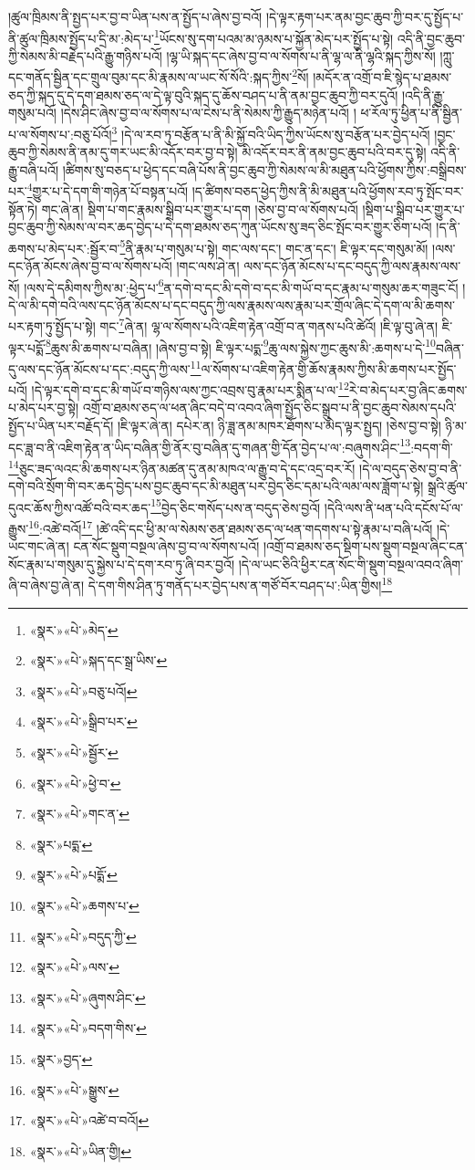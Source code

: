 །ཚུལ་ཁྲིམས་ནི་སྤྱད་པར་བྱ་བ་ཡིན་པས་ན་སྤྱོད་པ་ཞེས་བྱ་བའོ། །དེ་ལྟར་རྟག་པར་ནམ་བྱང་ཆུབ་ཀྱི་བར་དུ་སྤྱོད་པ་ནི་ཚུལ་ཁྲིམས་སྤྱོད་པ་དྲི་མ་:མེད་པ་\footnote{«སྣར་»«པེ་»མེད་}ཡོངས་སུ་དག་པའམ་མ་ཉམས་པ་སྐྱོན་མེད་པར་སྤྱོད་པ་སྟེ། འདི་ནི་བྱང་ཆུབ་ཀྱི་སེམས་མི་བརྗེད་པའི་རྒྱུ་གཉིས་པའོ། །ལྷ་ཡི་སྐད་དང་ཞེས་བྱ་བ་ལ་སོགས་པ་ནི་ལྷ་ལ་ནི་ལྷའི་སྐད་ཀྱིས་སོ། །ཀླུ་དང་གནོད་སྦྱིན་དང་གྲུལ་བུམ་དང་མི་རྣམས་ལ་ཡང་སོ་སོའི་:སྐད་ཀྱིས་\footnote{«སྣར་»«པེ་»སྐད་དང་སྒྲ་ཡིས་}སོ། །མདོར་ན་འགྲོ་བ་ཇི་སྙེད་པ་ཐམས་ཅད་ཀྱི་སྐད་དུ་དེ་དག་ཐམས་ཅད་ལ་དེ་ལྟ་བུའི་སྐད་དུ་ཆོས་བཤད་པ་ནི་ནམ་བྱང་ཆུབ་ཀྱི་བར་དུའོ། །འདི་ནི་རྒྱུ་གསུམ་པའོ། །དེས་ཤིང་ཞེས་བྱ་བ་ལ་སོགས་པ་ལ་ངེས་པ་ནི་སེམས་ཀྱི་རྒྱུད་མཉེན་པའོ། །
ཕ་རོལ་ཏུ་ཕྱིན་པ་ནི་སྦྱིན་པ་ལ་སོགས་པ་:བཅུ་པོའོ།\footnote{«སྣར་»«པེ་»བཅུ་པའོ།} །དེ་ལ་རབ་ཏུ་བརྩོན་པ་ནི་མི་སྐྱོ་བའི་ཡིད་ཀྱིས་ཡོངས་སུ་བརྩོན་པར་བྱེད་པའོ། །བྱང་ཆུབ་ཀྱི་སེམས་ནི་ནམ་དུ་གར་ཡང་མི་འདོར་བར་བྱ་བ་སྟེ། མི་འདོར་བར་ནི་ནམ་བྱང་ཆུབ་པའི་བར་དུ་སྟེ། འདི་ནི་རྒྱུ་བཞི་པའོ། །ཚིགས་སུ་བཅད་པ་ཕྱེད་དང་བཞི་པོས་ནི་བྱང་ཆུབ་ཀྱི་སེམས་ལ་མི་མཐུན་པའི་ཕྱོགས་ཀྱིས་:བསྒྲིབས་པར་\footnote{«སྣར་»«པེ་»སྒྲིབ་པར་}གྱུར་པ་དེ་དག་གི་གཉེན་པོ་བསྟན་པའོ། །ད་ཚིགས་བཅད་ཕྱེད་ཀྱིས་ནི་མི་མཐུན་པའི་ཕྱོགས་རབ་ཏུ་སྤོང་བར་སྟོན་ཏེ། གང་ཞེ་ན། སྡིག་པ་གང་རྣམས་སྒྲིབ་པར་གྱུར་པ་དག །ཅེས་བྱ་བ་ལ་སོགས་པའོ། །སྡིག་པ་སྒྲིབ་པར་གྱུར་པ་བྱང་ཆུབ་ཀྱི་སེམས་ལ་བར་ཆད་བྱེད་པ་དེ་དག་ཐམས་ཅད་ཀུན་ཡོངས་སུ་ཟད་ཅིང་སྤོང་བར་གྱུར་ཅིག་པའོ། །ད་ནི་ཆགས་པ་མེད་པར་:སྦྱོར་བ་\footnote{«སྣར་»«པེ་»སྦྱོར་}ནི་རྣམ་པ་གསུམ་པ་སྟེ། གང་ལས་དང་། གང་ན་དང་། ཇི་ལྟར་དང་གསུམ་མོ། །ལས་དང་ཉོན་མོངས་ཞེས་བྱ་བ་ལ་སོགས་པའོ། །གང་ལས་ཤེ་ན། ལས་དང་ཉོན་མོངས་པ་དང་བདུད་ཀྱི་ལས་རྣམས་ལས་སོ། །ལས་དེ་དམིགས་ཀྱིས་མ་:ཕྱེད་པ་\footnote{«སྣར་»«པེ་»ཕྱེ་བ་}ན་དགེ་བ་དང་མི་དགེ་བ་དང་མི་གཡོ་བ་དང་རྣམ་པ་གསུམ་ཆར་གཟུང་ངོ། །དེ་ལ་མི་དགེ་བའི་ལས་དང་ཉོན་མོངས་པ་དང་བདུད་ཀྱི་ལས་རྣམས་ལས་རྣམ་པར་གྲོལ་ཞིང་དེ་དག་ལ་མི་ཆགས་པར་རྟག་ཏུ་སྤྱོད་པ་སྟེ། གང་\footnote{«སྣར་»«པེ་»གང་ན་}ཞེ་ན། ལྷ་ལ་སོགས་པའི་འཇིག་རྟེན་འགྲོ་བ་ན་གནས་པའི་ཚེའོ། །ཇི་ལྟ་བུ་ཞེ་ན། ཇི་ལྟར་པདྨོ་\footnote{«སྣར་»པདྨ་}ཆུས་མི་ཆགས་པ་བཞིན། །ཞེས་བྱ་བ་སྟེ། ཇི་ལྟར་པདྨ་\footnote{«སྣར་»«པེ་»པདྨོ་}ཆུ་ལས་སྐྱེས་ཀྱང་ཆུས་མི་:ཆགས་པ་དེ་\footnote{«སྣར་»«པེ་»ཆགས་པ་}བཞིན་དུ་ལས་དང་ཉོན་མོངས་པ་དང་:བདུད་ཀྱི་ལས་\footnote{«སྣར་»«པེ་»བདུད་ཀྱི་}ལ་སོགས་པ་འཇིག་རྟེན་གྱི་ཆོས་རྣམས་ཀྱིས་མི་ཆགས་པར་སྤྱོད་པའོ། །དེ་ལྟར་དགེ་བ་དང་མི་གཡོ་བ་གཉིས་ལས་ཀྱང་འབྲས་བུ་རྣམ་པར་སྨིན་པ་ལ་\footnote{«སྣར་»«པེ་»ལས་}རེ་བ་མེད་པར་བྱ་ཞིང་ཆགས་པ་མེད་པར་བྱ་སྟེ། འགྲོ་བ་ཐམས་ཅད་ལ་ཕན་ཞིང་བདེ་བ་འབའ་ཞིག་སྤྱོད་ཅིང་སྒྲུབ་པ་ནི་བྱང་ཆུབ་སེམས་དཔའི་སྤྱོད་པ་ཡིན་པར་བརྗོད་དོ། །ཇི་ལྟར་ཞེ་ན། དཔེར་ན། ཉི་ཟླ་ནམ་མཁར་ཐོགས་པ་མེད་ལྟར་སྤྱད། །ཅེས་བྱ་བ་སྟེ། ཉི་མ་དང་ཟླ་བ་ནི་འཇིག་རྟེན་ན་ཡིད་བཞིན་གྱི་ནོར་བུ་བཞིན་དུ་གཞན་གྱི་དོན་བྱེད་པ་ལ་:བཞུགས་ཤིང་\footnote{«སྣར་»«པེ་»ཞུགས་ཤིང་}:བདག་གི་\footnote{«སྣར་»«པེ་»བདག་གིས་}ཅུང་ཟད་ལའང་མི་ཆགས་པར་ཉིན་མཚན་དུ་ནམ་མཁའ་ལ་རྒྱུ་བ་དེ་དང་འདྲ་བར་རོ། །དེ་ལ་བདུད་ཅེས་བྱ་བ་ནི་དགེ་བའི་སྲོག་གི་བར་ཆད་བྱེད་པས་བྱང་ཆུབ་དང་མི་མཐུན་པར་བྱེད་ཅིང་དམ་པའི་ལམ་ལས་ཟློག་པ་སྟེ། སྒྲའི་ཚུལ་དུའང་ཆོས་ཀྱིས་འཚོ་བའི་བར་ཆད་\footnote{«སྣར་»བྱད་}བྱེད་ཅིང་གསོད་པས་ན་བདུད་ཅེས་བྱའོ། །དེའི་ལས་ནི་ཕན་པའི་དངོས་པོ་ལ་རྒྱུས་\footnote{«སྣར་»«པེ་»སྒྱུས་}:འཚེ་བའོ།\footnote{«སྣར་»«པེ་»འཚེ་བ་བའོ།} །ཚེ་འདི་དང་ཕྱི་མ་ལ་སེམས་ཅན་ཐམས་ཅད་ལ་ཕན་གདགས་པ་སྟེ་རྣམ་པ་བཞི་པའོ། །དེ་ཡང་གང་ཞེ་ན། ངན་སོང་སྡུག་བསྔལ་ཞེས་བྱ་བ་ལ་སོགས་པའོ། །འགྲོ་བ་ཐམས་ཅད་སྡིག་པས་སྡུག་བསྔལ་ཞིང་ངན་སོང་རྣམ་པ་གསུམ་དུ་སྐྱེས་པ་དེ་དག་རབ་ཏུ་ཞི་བར་བྱའོ། །དེ་ལ་ཡང་ཅིའི་ཕྱིར་ངན་སོང་གི་སྡུག་བསྔལ་འབའ་ཞིག་ཞི་བ་ཞེས་བྱ་ཞེ་ན། དེ་དག་གིས་ཤིན་ཏུ་གནོད་པར་བྱེད་པས་ན་གཙོ་བོར་བཤད་པ་:ཡིན་གྱིས།\footnote{«སྣར་»«པེ་»ཡིན་གྱི།} 